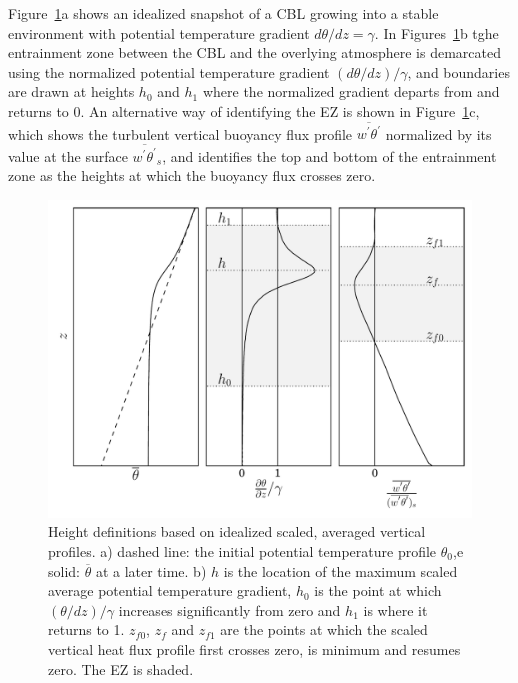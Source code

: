 \documentclass[referee]{svjour3}
\begin{document}
Figure~\ref{fig:hdefs}a shows an idealized  snapshot of a CBL growing into a stable environment with potential temperature gradient $d\theta/dz = \gamma$.  In Figures~\ref{fig:hdefs}b tghe entrainment zone between the CBL and the overlying atmosphere is demarcated using the normalized potential temperature gradient $(d\theta/dz)/\gamma$, and boundaries are drawn at heights $h_0$ and $h_1$ where the normalized gradient departs from and returns to 0.  An alternative way of identifying the EZ is shown in Figure~\ref{fig:hdefs}c, which shows the turbulent vertical buoyancy flux profile $\overline{w^\prime \theta^\prime}$ normalized by its value at the surface $\overline{w^\prime \theta^\prime}_s$, and identifies the top and bottom of the entrainment zone as the heights at which the buoyancy flux crosses zero.  

\begin{figure}[htbp]
    \centering
    
    \includegraphics[scale=.5]{figures/height_defs.pdf}
    \caption[label a, b c Height Definitions]{Height definitions based on idealized scaled, averaged vertical profiles. a) dashed line: the initial potential temperature profile $\theta_0$,e solid: $\overline{\theta}$ at a later time. b)  $h$ is the location of the maximum scaled average potential temperature gradient, $h_{0}$ is the point at which $(\theta/dz)/\gamma$ increases significantly from zero and $h_{1}$ is where it returns to 1.  $z_{f0}$, $z_{f}$ and $z_{f1}$ are the points at which the scaled vertical heat flux profile first crosses zero, is minimum and resumes zero. The EZ is shaded.}
    \label{fig:hdefs} 
\end{figure}
\end{document}
